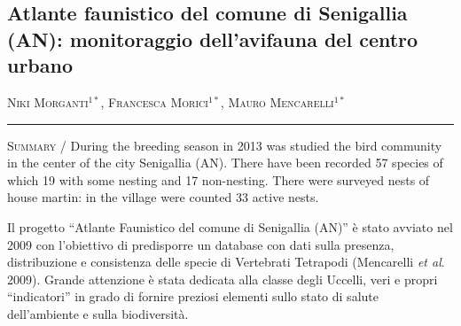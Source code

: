 \setcounter{figure}{0}
\setcounter{table}{0}

\begin{adjustwidth}{-3.5cm}{0cm}
\pagestyle{CIOpage}
\chapter*[Monitoraggio dell{\textquoteright}avifauna del comune di
Senigallia (AN)]{Atlante faunistico del comune di Senigallia (AN): monitoraggio
dell{\textquoteright}avifauna del centro urbano}

\textsc{Niki Morganti}$^{1*}$, \textsc{Francesca Morici}$^{1*}$, \textsc{Mauro Mencarelli}$^{1*}$\\

  
\noindent\color{MUSEBLUE}\rule{27cm}{2pt}
\vspace{1cm}
\end{adjustwidth}


{\small
\noindent \textsc{\color{MUSEBLUE} Summary} / During the breeding season in 2013 was studied the bird community in the
center of the city Senigallia (AN). There have been recorded 57 species
of which 19 with some nesting and 17 non-nesting. There were surveyed
nests of house martin: in the village were counted 33 active nests.\\
}

\vspace{1cm}
Il progetto {\textquotedblleft}Atlante Faunistico del comune di
Senigallia (AN){\textquotedblright} \`e stato avviato nel 2009 con
l'obiettivo di predisporre un database con dati sulla
presenza, distribuzione e consistenza delle specie di Vertebrati
Tetrapodi (Mencarelli \textit{et al}. 2009). Grande attenzione \`e
stata dedicata alla classe degli Uccelli, veri e propri
{\textquotedblleft}indicatori{\textquotedblright} in grado di fornire
preziosi elementi sullo stato di salute dell'ambiente
e sulla biodiversit\`a. 

